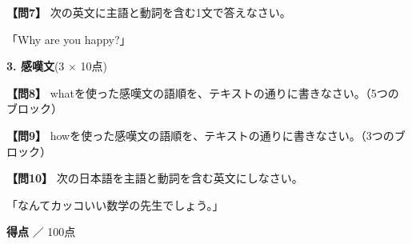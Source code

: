 \testqsep

\noindent\textbf{【問7】} 次の英文に主語と動詞を含む1文で答えなさい。

「Why are you happy?」

\testsectsep

\noindent\textbf{3. 感嘆文}(3 $\times$ 10点)

\noindent\textbf{【問8】} whatを使った感嘆文の語順を、テキストの通りに書きなさい。（5つのブロック）

\testqsep

\noindent\textbf{【問9】} howを使った感嘆文の語順を、テキストの通りに書きなさい。（3つのブロック）

\testqsep

\noindent\textbf{【問10】} 次の日本語を主語と動詞を含む英文にしなさい。

「なんてカッコいい数学の先生でしょう。」

\testqsep

\begin{flushright}
\textbf{得点} \underline{\hspace{8em}} ／ 100点
\end{flushright}
